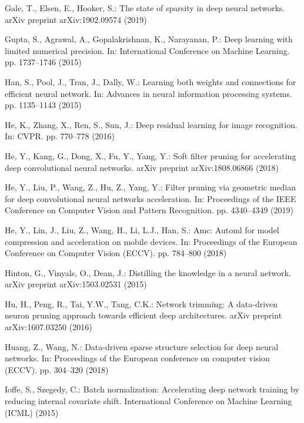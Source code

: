 \documentclass[runningheads, envcountsame, a4paper]{llncs}
\begin{document}
\begin{thebibliography}{10}
  Gale, T., Elsen, E., Hooker, S.: The state of sparsity in deep neural networks.
    arXiv preprint arXiv:1902.09574  (2019)
  
  Gupta, S., Agrawal, A., Gopalakrishnan, K., Narayanan, P.: Deep learning with
    limited numerical precision. In: International Conference on Machine
    Learning. pp. 1737--1746 (2015)
  
  Han, S., Pool, J., Tran, J., Dally, W.: Learning both weights and connections
    for efficient neural network. In: Advances in neural information processing
    systems. pp. 1135--1143 (2015)
  
  He, K., Zhang, X., Ren, S., Sun, J.: Deep residual learning for image
    recognition. In: CVPR. pp. 770--778 (2016)
  
  He, Y., Kang, G., Dong, X., Fu, Y., Yang, Y.: Soft filter pruning for
    accelerating deep convolutional neural networks. arXiv preprint
    arXiv:1808.06866  (2018)
  
  He, Y., Liu, P., Wang, Z., Hu, Z., Yang, Y.: Filter pruning via geometric
    median for deep convolutional neural networks acceleration. In: Proceedings
    of the IEEE Conference on Computer Vision and Pattern Recognition. pp.
    4340--4349 (2019)
  
  He, Y., Lin, J., Liu, Z., Wang, H., Li, L.J., Han, S.: Amc: Automl for model
    compression and acceleration on mobile devices. In: Proceedings of the
    European Conference on Computer Vision (ECCV). pp. 784--800 (2018)
  
  Hinton, G., Vinyals, O., Dean, J.: Distilling the knowledge in a neural
    network. arXiv preprint arXiv:1503.02531  (2015)
  
  Hu, H., Peng, R., Tai, Y.W., Tang, C.K.: Network trimming: A data-driven neuron
    pruning approach towards efficient deep architectures. arXiv preprint
    arXiv:1607.03250  (2016)
  
  Huang, Z., Wang, N.: Data-driven sparse structure selection for deep neural
    networks. In: Proceedings of the European conference on computer vision
    (ECCV). pp. 304--320 (2018)
  
  Ioffe, S., Szegedy, C.: Batch normalization: Accelerating deep network training
    by reducing internal covariate shift. International Conference on Machine
    Learning (ICML)  (2015)
  

\end{thebibliography}
\end{document}
